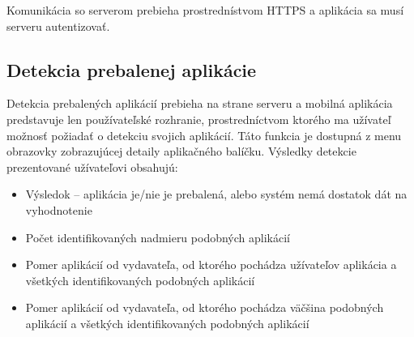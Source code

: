 Komunikácia so serverom prebieha prostrednístvom HTTPS a aplikácia sa musí serveru autentizovať.

\subsection{Detekcia prebalenej aplikácie}
Detekcia prebalených aplikácií prebieha na strane serveru a mobilná aplikácia predstavuje len používateľské rozhranie, prostredníctvom ktorého ma užívateľ možnosť požiadať o detekciu svojich aplikácií. Táto funkcia je dostupná z menu obrazovky zobrazujúcej detaily aplikačného balíčku. Výsledky detekcie prezentované užívateľovi obsahujú:
\begin{itemize}
\item Výsledok -- aplikácia je/nie je prebalená, alebo systém nemá dostatok dát na vyhodnotenie
	\item Počet identifikovaných nadmieru podobných aplikácií
	\item Pomer aplikácií od vydavateľa, od ktorého pochádza užívateľov aplikácia a všetkých identifikovaných podobných aplikácií
	\item Pomer aplikácií od vydavateľa, od ktorého pochádza väčšina podobných aplikácií a všetkých identifikovaných podobných aplikácií
\end{itemize}
	
	
